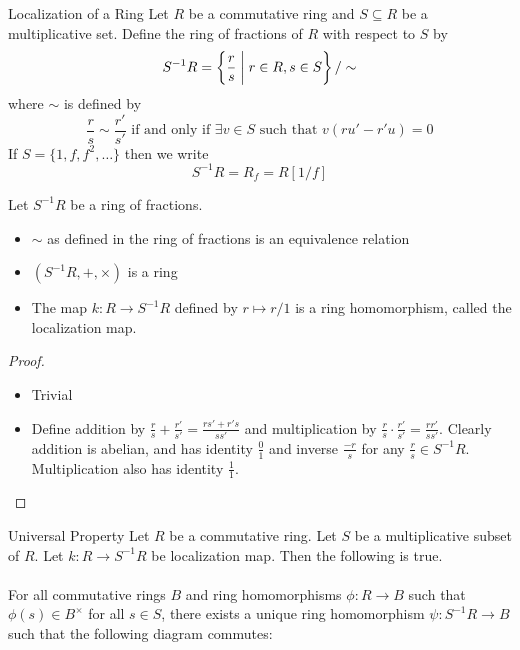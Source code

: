 \documentclass[a4paper]{article}
\begin{document}
\begin{defn}{Localization of a Ring}{} Let $R$ be a commutative ring and $S\subseteq R$ be a multiplicative set. Define the ring of fractions of $R$ with respect to $S$ by $$S^{-1}R=\left\{\frac{r}{s}\;\bigg{|}\;r\in R,s\in S\right\}/\sim$$ where $\sim$ is defined by $$\frac{r}{s}\sim\frac{r'}{s'}\text{ if and only if }\exists v\in S\text{ such that }v(ru'-r'u)=0$$ If $S=\{1,f,f^2,\dots\}$ then we write $$S^{-1}R=R_f=R[1/f]$$
\end{defn}

\begin{prp}{}{} Let $S^{-1}R$ be a ring of fractions. 
\begin{itemize}
\item $\sim$ as defined in the ring of fractions is an equivalence relation
\item $(S^{-1}R,+,\times)$ is a ring
\item The map $k:R\to S^{-1}R$ defined by $r\mapsto r/1$ is a ring homomorphism, called the localization map. 
\end{itemize}\tcbline
\begin{proof}~\\
\begin{itemize}
\item Trivial
\item Define addition by $\frac{r}{s}+\frac{r'}{s'}=\frac{rs'+r's}{ss'}$ and multiplication by $\frac{r}{s}\cdot\frac{r'}{s'}=\frac{rr'}{ss'}$. Clearly addition is abelian, and has identity $\frac{0}{1}$ and inverse $\frac{-r}{s}$ for any $\frac{r}{s}\in S^{-1}R$. Multiplication also has identity $\frac{1}{1}$. 
\end{itemize}
\end{proof}
\end{prp}

\begin{prp}{Universal Property}{} Let $R$ be a commutative ring. Let $S$ be a multiplicative subset of $R$. Let $k:R\to S^{-1}R$ be localization map. Then the following is true. \\~\\

For all commutative rings $B$ and ring homomorphisms $\phi:R\to B$ such that $\phi(s)\in B^\times$ for all $s\in S$, there exists a unique ring homomorphism $\psi:S^{-1}R\to B$ such that the following diagram commutes: \\~\\
\end{prp}
\end{document}

